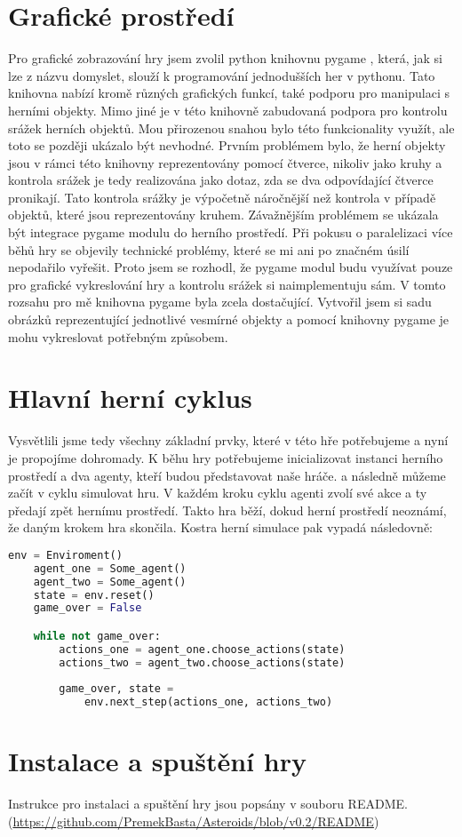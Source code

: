 \section{Grafické prostředí}
Pro grafické zobrazování hry jsem zvolil python knihovnu pygame \cite{pygame}, která, jak si lze z názvu domyslet, slouží k programování jednodušších her v pythonu.
Tato knihovna nabízí kromě různých grafických funkcí, také podporu pro manipulaci s herními objekty. Mimo jiné je v této knihovně zabudovaná podpora pro kontrolu srážek herních objektů.
Mou přirozenou snahou bylo této funkcionality využít, ale toto se později ukázalo být nevhodné.
Prvním problémem bylo, že herní objekty jsou v rámci této knihovny reprezentovány pomocí čtverce, nikoliv jako kruhy a kontrola srážek je tedy realizována jako dotaz, zda se dva odpovídající čtverce pronikají.
Tato kontrola srážky je výpočetně náročnější než kontrola v případě objektů, které jsou reprezentovány kruhem.  
Závažnějším problémem se ukázala být integrace pygame modulu do herního prostředí. Při pokusu o paralelizaci více běhů hry se objevily technické problémy, které se mi ani po značném úsilí nepodařilo vyřešit.
Proto jsem se rozhodl, že pygame modul budu využívat pouze pro grafické vykreslování hry a kontrolu srážek si naimplementuju sám.
V tomto rozsahu pro mě knihovna pygame byla zcela dostačující. Vytvořil jsem si sadu obrázků reprezentující jednotlivé vesmírné objekty a pomocí knihovny pygame je mohu vykreslovat potřebným způsobem.


\section{Hlavní herní cyklus}
Vysvětlili jsme tedy všechny základní prvky, které v této hře potřebujeme a nyní je propojíme dohromady.
K běhu hry potřebujeme inicializovat instanci herního prostředí a dva agenty, kteří budou představovat naše hráče.
a následně můžeme začít v cyklu simulovat hru.
V každém kroku cyklu agenti zvolí své akce a ty předají zpět hernímu prostředí.
Takto hra běží, dokud herní prostředí neoznámí, že daným krokem hra skončila.
Kostra herní simulace pak vypadá následovně:

\begin{lstlisting}[language=Python]
    env = Enviroment()
    agent_one = Some_agent()
    agent_two = Some_agent()    
    state = env.reset()
    game_over = False

    while not game_over:
        actions_one = agent_one.choose_actions(state)    
        actions_two = agent_two.choose_actions(state)
        
        game_over, state = 
            env.next_step(actions_one, actions_two)
\end{lstlisting}


\section{Instalace a spuštění hry}
Instrukce pro instalaci a spuštění hry jsou popsány v souboru README. (\url{https://github.com/PremekBasta/Asteroids/blob/v0.2/README})

